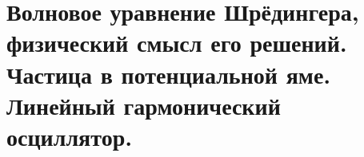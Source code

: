 \chapter{Волновое уравнение Шрёдингера, физический смысл его решений. 
Частица в потенциальной яме. Линейный гармонический осциллятор.}

\newpage
